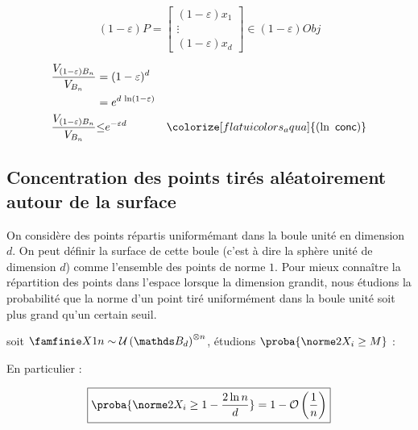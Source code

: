 \begin{equation}
    (1-\varepsilon)P = \begin{bmatrix} (1-\varepsilon)x_1 \\ \vdots \\ (1-\varepsilon)x_d \end{bmatrix} \in (1-\varepsilon)Obj
\end{equation}

\begin{align}
    \frac{V_{(1-\varepsilon)B_n}}{V_{B_n}}
    & =
    (1 - \varepsilon)^d
    \\
    & =
    e^{d \, \ln(1 - \varepsilon)} \notag
    \\
    \frac{V_{(1-\varepsilon)B_n}}{V_{B_n}} & {\leq}
    e^{-\varepsilon d} & \colorize[flatuicolors_aqua]{(\ln \textsf{ conc})}
\end{align}

\subsection{Concentration des points tirés aléatoirement autour de la surface}

On considère des points répartis uniformémant dans la boule unité en dimension $d$. On peut définir la surface de cette boule (c'est à dire la sphère unité de dimension $d$) comme l'ensemble des points de norme $1$. Pour mieux connaître la répartition des points dans l'espace lorsque la dimension grandit, nous étudions la probabilité que la norme d'un point tiré uniformément dans la boule unité soit plus grand qu'un certain seuil.

\bigskip

\noindent soit $\famfinie X 1 n \sim \mathcal U\left( \mathds B_d \right)^{\otimes n}$, étudions $\proba{\norme 2 {X_i} \geq M}$ :

\bigskip

\noindent En particulier :

\begin{equation}
    \boxed{
        \proba{ 
            \norme 2 {X_i} \geq 1 - \frac{2 \ln n}{d}
        } 
        = 
        1 - \mathcal O\left(\frac 1 n \right)
    }
\end{equation}


